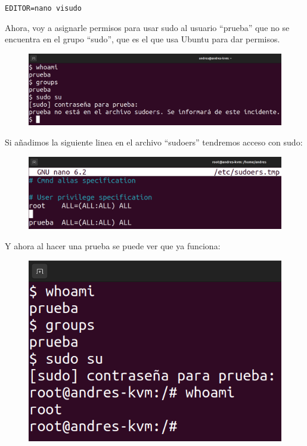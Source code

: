 \documentclass{article}
\begin{document}
\verb|EDITOR=nano visudo|

Ahora, voy a asignarle permisos para usar sudo al usuario ``prueba'' que no se encuentra en el grupo ``sudo'', que es el que usa Ubuntu para dar permisos.

\begin{figure}[H]
    \includegraphics[width=\textwidth]{imagenes/sudoprueba.png}
\end{figure}

Si añadimos la siguiente linea en el archivo ``sudoers'' tendremos acceso con sudo:

\begin{figure}[H]
    \includegraphics[width=\textwidth]{imagenes/sudoersprueba.png}
\end{figure}


Y ahora al hacer una prueba se puede ver que ya funciona:

\begin{figure}[H]
    \includegraphics[width=\textwidth]{imagenes/sudopruebaok.png}
\end{figure}
\end{document}
